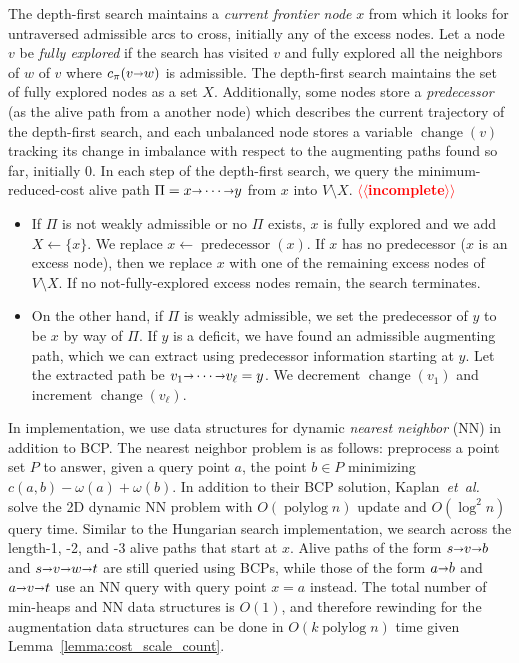 \documentclass[11pt]{article}
\makeatletter
\def\etal{\emph{et~al.}}
\def\etal{\textit{et~al.}}
\def\polylog{\mathop{\mathrm{polylog}}}
\def\set#1{\{ #1 \}}
\def\arcto{\mathord\shortrightarrow}
\def\arc#1#2{#1\arcto#2}
\numberwithin{figure}{section}
\def\EMPH#1{\textcolor{BrickRed}{{\emph{#1}}}}
\def\n@te#1{\textsf{\boldmath \textbf{$\langle\!\langle$#1$\rangle\!\rangle$}}\leavevmode}
\def\note#1{\textcolor{red}{\n@te{#1}}}
\makeatother
\begin{document}
The depth-first search maintains a \EMPH{current frontier node} $x$ from
which it looks for untraversed admissible arcs to cross, initially any of the
excess nodes.
Let a node $v$ be \EMPH{fully explored} if the search has visited $v$ and
fully explored all the neighbors of $w$ of $v$ where $c_\pi(\arc vw)$ is admissible.
The depth-first search maintains the set of fully explored nodes as a set $X$.
Additionally, some nodes store a \EMPH{predecessor} (as the alive path from a
another node) which describes the current trajectory of the depth-first search,
and each unbalanced node stores a variable $\operatorname{change}(v)$ tracking
its change in imbalance with respect to the augmenting paths found so far,
initially 0.
In each step of the depth-first search, we query the minimum-reduced-cost alive
path $\Pi = x \arcto \cdots \arcto y$ from $x$ into $V \setminus X$.
\note{incomplete} %
\begin{itemize}
\item If $\Pi$ is not weakly admissible or no $\Pi$ exists, $x$ is fully explored
	and we add $X \gets \set{x}$.
	We replace $x \gets \operatorname{predecessor}(x)$.
	If $x$ has no predecessor ($x$ is an excess node), then we replace $x$
	with one of the remaining excess nodes of $V \setminus X$.
	If no not-fully-explored excess nodes remain, the search terminates.
\item On the other hand, if $\Pi$ is weakly admissible, we set the predecessor
	of $y$ to be $x$ by way of $\Pi$.
	If $y$ is a deficit, we have found an admissible augmenting path,
	which we can extract using predecessor information starting at $y$.
	Let the extracted path be $v_1 \arcto \cdots \arcto v_\ell = y$.
	We decrement $\operatorname{change}(v_1)$ and increment $\operatorname{change}(v_\ell)$.
\end{itemize}

In implementation, we use data structures for dynamic \EMPH{nearest neighbor}
(NN) in addition to BCP.
The nearest neighbor problem is as follows:
preprocess a point set $P$ to answer, given a query point $a$, the point
$b \in P$ minimizing $c(a, b) - \omega(a) + \omega(b)$.
In addition to their BCP solution, Kaplan~\etal~\cite{KMRSS17} solve the
2D dynamic NN problem with $O(\polylog n)$ update and $O(\log^2 n)$ query time.
Similar to the Hungarian search implementation, we search across the
length-1, -2, and -3 alive paths that start at $x$.
Alive paths of the form $s \arcto v \arcto b$ and $s \arcto v \arcto w \arcto t$ are
still queried using BCPs, while those of the form $a \arcto b$ and
$a \arcto v \arcto t$ use an NN query with query point $x = a$ instead.
The total number of min-heaps and NN data structures is $O(1)$, and therefore
rewinding for the augmentation data structures can be done in $O(k\polylog n)$
time given Lemma~\ref{lemma:cost_scale_count}.
\end{document}
